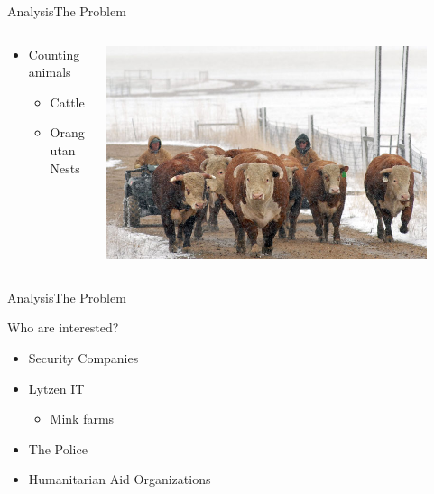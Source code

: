 \begin{frame}{Analysis}{The Problem}
    \begin{columns}[T]
        \begin{column}{.5\textwidth}
            \begin{itemize}
                \item Counting animals
                \begin{itemize}
                    \item Cattle
                    \item Orangutan Nests
                \end{itemize}
            \end{itemize}
        \end{column}
        \begin{column}{.5\textwidth}
            \includegraphics[width=0.9\textwidth]{images/cattle-management.jpg}
        \end{column}
    \end{columns}
\end{frame}

\begin{frame}{Analysis}{The Problem}
    \begin{block}{Who are interested?}
    \begin{itemize}
        \item Security Companies
        \item Lytzen IT
        \begin{itemize}
            \item Mink farms
        \end{itemize}
        \item The Police
        \item Humanitarian Aid Organizations
    \end{itemize}
    \end{block}
\end{frame}

